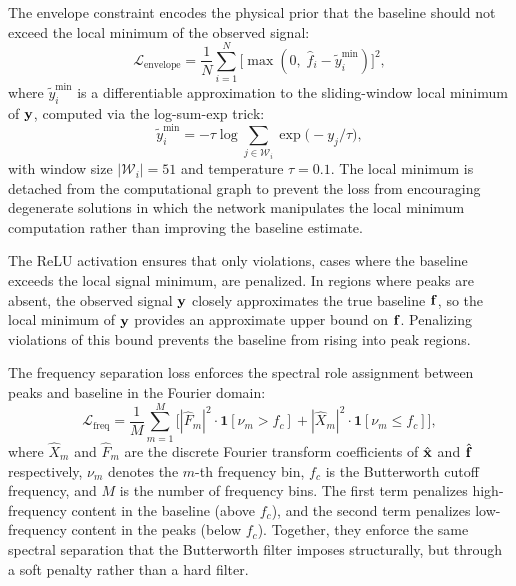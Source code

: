 The envelope constraint encodes the physical prior that the baseline should not exceed the local minimum of the observed signal:
\begin{equation}
    \mathcal{L}_{\text{envelope}} = \frac{1}{N} \sum_{i=1}^{N} \big[\max(0,\; \hat{f}_i - \tilde{y}_i^{\min})\big]^2,
    \label{eq:envelope_loss}
\end{equation}
where $\tilde{y}_i^{\min}$ is a differentiable approximation to the sliding-window local minimum of $\mathbf{y}$, computed via the log-sum-exp trick:
\begin{equation}
    \tilde{y}_i^{\min} = -\tau \log \sum_{j \in \mathcal{W}_i} \exp\!\big(-y_j / \tau\big),
    \label{eq:soft_local_min}
\end{equation}
with window size $|\mathcal{W}_i| = 51$ and temperature $\tau = 0.1$. The local minimum is detached from the computational graph to prevent the loss from encouraging degenerate solutions in which the network manipulates the local minimum computation rather than improving the baseline estimate.

The ReLU activation ensures that only violations, cases where the baseline exceeds the local signal minimum, are penalized. In regions where peaks are absent, the observed signal $\mathbf{y}$ closely approximates the true baseline $\mathbf{f}$, so the local minimum of $\mathbf{y}$ provides an approximate upper bound on $\mathbf{f}$. Penalizing violations of this bound prevents the baseline from rising into peak regions.

The frequency separation loss enforces the spectral role assignment between peaks and baseline in the Fourier domain:
\begin{equation}
    \mathcal{L}_{\text{freq}} = \frac{1}{M} \sum_{m=1}^{M} \bigg[ |\hat{F}_m|^2 \cdot \mathbf{1}[\nu_m > f_c] + |\hat{X}_m|^2 \cdot \mathbf{1}[\nu_m \leq f_c] \bigg],
    \label{eq:freq_loss}
\end{equation}
where $\hat{X}_m$ and $\hat{F}_m$ are the discrete Fourier transform coefficients of $\hat{\mathbf{x}}$ and $\hat{\mathbf{f}}$ respectively, $\nu_m$ denotes the $m$-th frequency bin, $f_c$ is the Butterworth cutoff frequency, and $M$ is the number of frequency bins. The first term penalizes high-frequency content in the baseline (above $f_c$), and the second term penalizes low-frequency content in the peaks (below $f_c$). Together, they enforce the same spectral separation that the Butterworth filter imposes structurally, but through a soft penalty rather than a hard filter.

